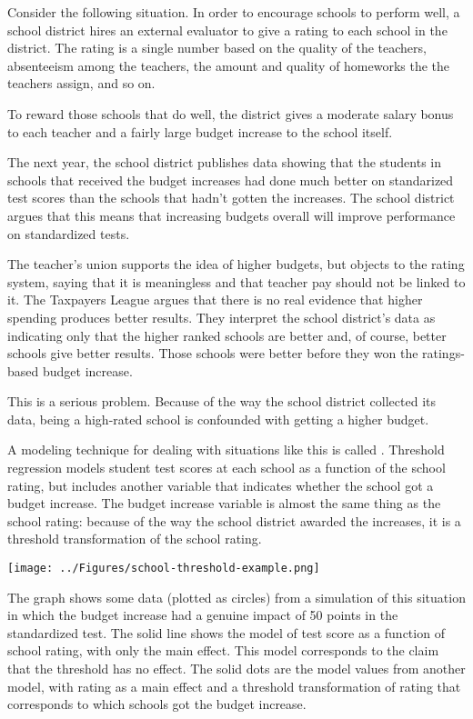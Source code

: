 

Consider the following situation. In order to encourage schools to perform
well, a school district hires an external evaluator to give a rating to
each school in the district.  The rating is a single number based on
the quality of the teachers, absenteeism among the teachers, the
amount and quality of homeworks the the teachers assign, and so on.  

To reward those schools that do well, the district gives a moderate
salary bonus to each teacher and a fairly large budget increase to the
school itself.

The next year, the school district publishes data showing that the
students in schools that received the budget increases had done much
better on standarized test scores than the schools that hadn't gotten
the increases.  The school district argues that this means that
increasing budgets overall will improve performance on standardized tests.

The teacher's union supports the idea of higher budgets, but objects
to the rating system,  saying that it is
meaningless and that teacher pay should not be linked to it.  The Taxpayers
League argues that there is no real evidence that higher spending
produces better results.  They interpret the school district's data as
indicating only that the higher ranked schools are better and, of
course, better schools give better results.  Those schools were better
before they won the ratings-based budget increase.

This is a serious problem.  Because of the way the school district
collected its data, being a high-rated school is confounded with
getting a higher budget.  

A modeling technique for dealing with situations like this is called
.  Threshold regression 
models student test scores at each school as a function of the school
rating, but includes another variable that indicates whether the school
got a budget increase.  The budget increase variable is almost the
same thing as the school rating: because of the way the school
district awarded the increases, it is a threshold transformation of
the school rating.

\centerline{\texttt{[image: ../Figures/school-threshold-example.png]}}

The graph shows some data (plotted as circles) 
from a simulation of this situation in which the budget increase 
had a genuine impact of 50 points in the standardized test.  The
solid line shows the model of test score as a function of school
rating, with only the main effect. This model corresponds to the claim
that the threshold has no effect.  The solid dots are the model
values from another model, with rating as a main effect and a
threshold transformation of rating that corresponds to which schools
got the budget increase.

